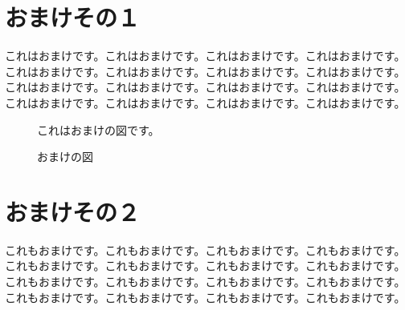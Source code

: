 \documentclass[12pt,dvipdfmx]{jarticle} %
\begin{document}
\section{おまけその１}
\label{omake1}

これはおまけです。これはおまけです。これはおまけです。これはおまけです。
これはおまけです。これはおまけです。これはおまけです。これはおまけです。
これはおまけです。これはおまけです。これはおまけです。これはおまけです。
これはおまけです。これはおまけです。これはおまけです。これはおまけです。

\begin{figure}
\centerline{これはおまけの図です。}
\caption{おまけの図}
\end{figure}


\section{おまけその２}

これもおまけです。これもおまけです。これもおまけです。これもおまけです。
これもおまけです。これもおまけです。これもおまけです。これもおまけです。
これもおまけです。これもおまけです。これもおまけです。これもおまけです。
これもおまけです。これもおまけです。これもおまけです。これもおまけです。
\end{document}
